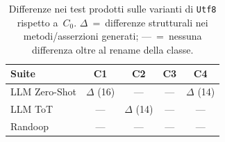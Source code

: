 \begin{table}[H]
\centering
\footnotesize
\begin{tabular}{lcccc}
\toprule
\textbf{Suite} & \textbf{C1} & \textbf{C2} & \textbf{C3} & \textbf{C4} \\
\midrule
LLM Zero-Shot & $\Delta$ (16) & ---          & ---          & $\Delta$ (14) \\
LLM ToT       & ---           & $\Delta$ (14) & ---          & ---           \\
Randoop        & ---           & ---           & ---          & ---           \\
\bottomrule
\end{tabular}
\caption{Differenze nei test prodotti sulle varianti di \texttt{Utf8} rispetto
a~$C_0$. $\Delta$~=~differenze strutturali nei metodi/asserzioni generati;
---~=~nessuna differenza oltre al rename della classe.}
\label{tab:utf8-delta}
\end{table}